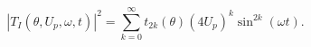 \begin{equation}
|T_{I}(\theta ,U_{p},\omega ,t)|^{2}=\sum_{k=0}^{\infty }t_{2k}(\theta
)(4U_{p})^{k}\sin ^{2k}(\omega t).  \label{exp}
\end{equation}


